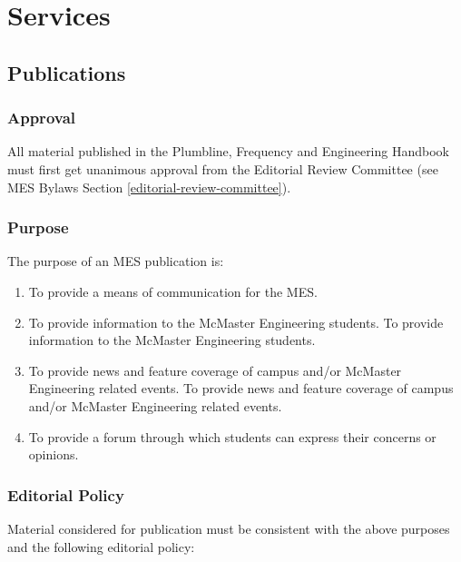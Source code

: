 \section{Services}
\label{services}

\subsection{Publications}
\label{publications}

\subsubsection{Approval}
\label{approval}
All material published in the Plumbline, Frequency and Engineering
Handbook must first get unanimous approval from the Editorial Review
Committee (see MES Bylaws Section \ref{editorial-review-committee}).

\subsubsection{Purpose}
\label{purpose}
The purpose of an MES publication is:

\begin{enumerate}
 \item
  To provide a means of communication for the MES.
 \item
  To provide information to the McMaster Engineering students. 
  To provide information to the McMaster Engineering students. 
 \item
  To provide news and feature coverage of campus and/or McMaster Engineering related events.
  To provide news and feature coverage of campus and/or McMaster Engineering related events.
 \item
  To provide a forum through which students can express their concerns or opinions.

\end{enumerate}

\subsubsection{Editorial Policy}
\label{editorial-policy}
Material considered for publication must be consistent with the above
purposes and the following editorial policy:

